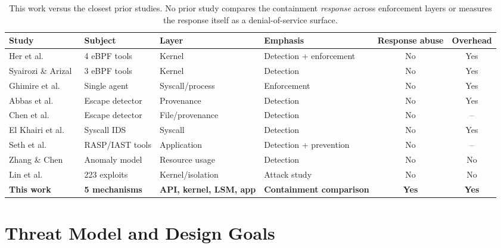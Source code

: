 \documentclass[10pt,conference]{IEEEtran}
\begin{document}
\begin{table}[t]
\caption{This work versus the closest prior studies. No prior study compares the containment \emph{response} across enforcement layers or measures the response itself as a denial-of-service surface.}
\label{tab:related}
\centering
\begin{tabular}{llllcc}
\toprule
Study & Subject & Layer & Emphasis & Response abuse & Overhead\\
\midrule
Her et al.~\cite{her2025}          & 4 eBPF tools    & Kernel          & Detection + enforcement & No  & Yes\\
Syairozi \& Arizal~\cite{syairozi2025} & 3 eBPF tools & Kernel          & Detection               & No  & Yes\\
Ghimire et al.~\cite{ghimire2025}  & Single agent    & Syscall/process & Enforcement             & No  & Yes\\
Abbas et al.~\cite{abbas2022}      & Escape detector & Provenance      & Detection               & No  & Yes\\
Chen et al.~\cite{chen2024}        & Escape detector & File/provenance & Detection               & No  & --\\
El Khairi et al.~\cite{elkhairi2022} & Syscall IDS   & Syscall         & Detection               & No  & Yes\\
Seth et al.~\cite{seth2025}        & RASP/IAST tools & Application     & Detection + prevention  & No  & --\\
Zhang \& Chen~\cite{zhang2023}     & Anomaly model   & Resource usage  & Detection               & No  & No\\
Lin et al.~\cite{lin2018}          & 223 exploits    & Kernel/isolation & Attack study           & No  & No\\
\midrule
\textbf{This work} & \textbf{5 mechanisms} & \textbf{API, kernel, LSM, app} & \textbf{Containment comparison} & \textbf{Yes} & \textbf{Yes}\\
\bottomrule
\end{tabular}
\end{table}

\section{Threat Model and Design Goals}\label{sec:threat}
\end{document}
